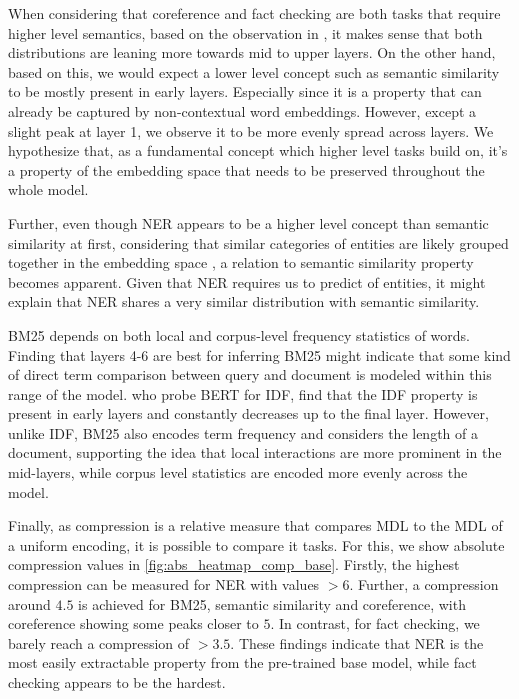 When considering that coreference and fact checking are both tasks that require higher level semantics, based on the observation in \cite{tenney-etal-2019-bert}, it makes sense that both distributions are leaning more towards mid to upper layers. On the other hand, based on this, we would expect a lower level concept such as semantic similarity to be mostly present in early layers. Especially since it is a property that can already be captured by non-contextual word embeddings. However, except a slight peak at layer 1, we observe it to be more evenly spread across layers. We hypothesize that, as a fundamental concept which higher level tasks build on, it's a property of the embedding space that needs to be preserved throughout the whole model.

Further, even though NER appears to be a higher level concept than semantic similarity at first, considering that similar categories of entities are likely grouped together in the embedding space \cite{DBLP:journals/corr/abs-1301-3781, pennington2014glove}, a relation to semantic similarity property becomes apparent. Given that NER requires us to predict  of entities, it might explain that NER shares a very similar distribution with semantic similarity.

BM25 depends on both local and corpus-level frequency statistics of words. Finding that layers 4-6 are best for inferring BM25 might indicate that some kind of direct term comparison between query and document is modeled within this range of the model. \cite{https://doi.org/10.48550/arxiv.2202.12191} who probe BERT for IDF, find that the IDF property is present in early layers and constantly decreases up to the final layer. However, unlike IDF, BM25 also encodes term frequency and considers the length of a document, supporting the idea that local interactions are more prominent in the mid-layers, while corpus level statistics are encoded more evenly across the model.

Finally, as compression is a relative measure that compares MDL to the MDL of a uniform encoding, it is possible to compare it  tasks. For this, we show absolute compression values in \autoref{fig:abs_heatmap_comp_base}. Firstly, the highest compression can be measured for NER with values $>6$. Further, a compression around $4.5$ is achieved for BM25, semantic similarity and coreference, with coreference showing some peaks closer to $5$. In contrast, for fact checking, we barely reach a compression of $>3.5$. These findings indicate that NER is the most easily extractable property from the pre-trained base model, while fact checking appears to be the hardest.


